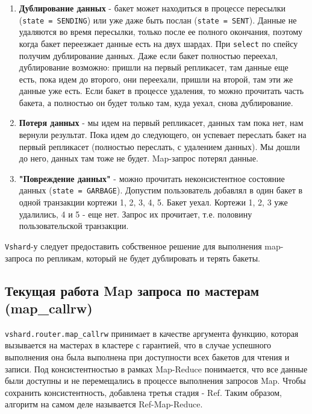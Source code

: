 \begin{enumerate}
\item \textbf{Дублирование данных} - бакет может находиться в процессе
    пересылки (\texttt{state = SENDING}) или уже даже быть послан
        (\texttt{state = SENT}). Данные не удаляются во время пересылки, только
        после ее полного окончания, поэтому когда бакет переезжает данные есть
        на двух шардах. При \texttt{select} по спейсу получим дублирование
        данных. Даже если бакет полностью переехал, дублирование возможно:
        пришли на первый репликасет, там данные еще есть, пока идем до второго,
        они переехали, пришли на второй, там эти же данные уже есть. Если бакет
        в процессе удаления, то можно прочитать часть бакета, а полностью он
        будет только там, куда уехал, снова дублирование.

\item \textbf{Потеря данных} - мы идем на первый репликасет, данных там пока
    нет, нам вернули результат. Пока идем до следующего, он успевает переслать
        бакет на первый репликасет (полностью переслать, с удалением данных).
        Мы дошли до него, данных там тоже не будет. Map-запрос потерял данные.

\item \textbf{"Повреждение данных"} - можно прочитать неконсистентное состояние
    данных (\texttt{state = GARBAGE}). Допустим пользователь добавлял в один
        бакет в одной транзакции кортежи 1, 2, 3, 4, 5. Бакет уехал. Кортежи 1, 2,
        3 уже удалились, 4 и 5 - еще нет. Запрос их прочитает, т.е.
        половину пользовательской транзакции.

\end{enumerate}

\texttt{Vshard}-у следует предоставить собственное решение для выполнения
map-запроса по репликам, который не будет дублировать и терять бакеты.

\subsection{Текущая работа Map запроса по мастерам (map\_callrw)}

\texttt{vshard.router.map\_callrw} принимает в качестве аргумента функцию,
которая вызывается на мастерах в кластере с гарантией, что в случае успешного
выполнения она была выполнена при доступности всех бакетов для чтения и записи.
Под консистентностью в рамках Map-Reduce понимается, что все данные были
доступны и не перемещались в процессе выполнения запросов Map. Чтобы сохранить
консистентность, добавлена третья стадия - Ref. Таким образом, алгоритм на
самом деле называется Ref-Map-Reduce.

